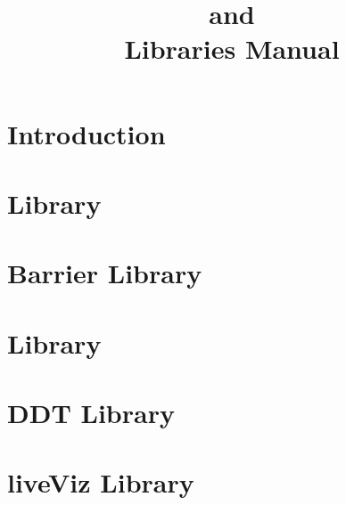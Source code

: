 \documentclass[10pt]{report}
\title{\converse{} and \charmpp{}\\ Libraries Manual}
\begin{document}
\maketitle

\chapter{Introduction}

\chapter{\irecv{} Library}

\chapter{Barrier Library}

\chapter{\tempo{} Library}

\chapter{DDT Library}

\chapter{liveViz Library}



\end{document}
